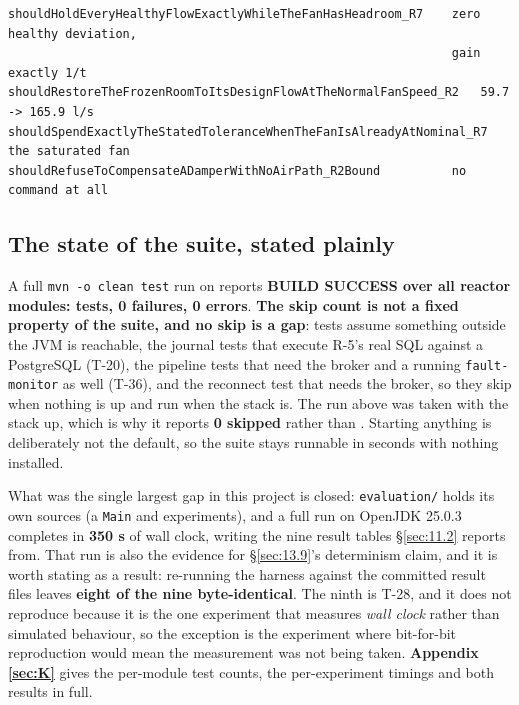 \begin{footnotesize}
\begin{verbatim}
shouldHoldEveryHealthyFlowExactlyWhileTheFanHasHeadroom_R7    zero healthy deviation,
                                                              gain exactly 1/t
shouldRestoreTheFrozenRoomToItsDesignFlowAtTheNormalFanSpeed_R2   59.7 -> 165.9 l/s
shouldSpendExactlyTheStatedToleranceWhenTheFanIsAlreadyAtNominal_R7   the saturated fan
shouldRefuseToCompensateADamperWithNoAirPath_R2Bound          no command at all
\end{verbatim}
\end{footnotesize}

\subsection{The state of the suite, stated plainly}\label{sec:10.2}

A full \texttt{mvn -o clean test} run on \factSuiteRunDate{} reports \textbf{BUILD SUCCESS over all
\factReactorModules{} reactor modules: \factSuiteTests{} tests, 0 failures, 0 errors}.
\textbf{The skip count is not a fixed property of the suite, and no skip is a gap}:
\factGuardedTests{} tests assume something outside the JVM is reachable, the
\factJournalTests{} journal tests that execute R-5's real SQL against a PostgreSQL (T-20), the
\factPipelineTests{} pipeline tests that need the broker and a running \texttt{fault-monitor} as
well (T-36), and the \factReconnectTests{} reconnect test that needs the broker, so they skip
when nothing is up and run when the stack is. The run above was taken with the stack up, which is
why it reports \textbf{0 skipped} rather than \factGuardedTests{}. Starting anything is
deliberately not the default, so the suite stays runnable in seconds with nothing installed.

What was the single largest gap in this project is closed: \texttt{evaluation/} holds its own sources
(a \texttt{Main} and \textbf{\factExperiments{}} experiments), and a full run on OpenJDK 25.0.3 completes in
\textbf{350 s} of wall clock, writing the nine result tables §\ref{sec:11.2} reports from. That run is also the
evidence for §\ref{sec:13.9}'s determinism claim, and it is worth stating as a result: re-running the harness
against the committed result files leaves \textbf{eight of the nine byte-identical}. The ninth is
T-28, and it does not reproduce because it is the one experiment that measures \emph{wall clock}
rather than simulated behaviour, so the exception is the experiment where bit-for-bit reproduction
would mean the measurement was not being taken. \textbf{Appendix \ref{sec:K}} gives the per-module test counts,
the per-experiment timings and both results in full.
